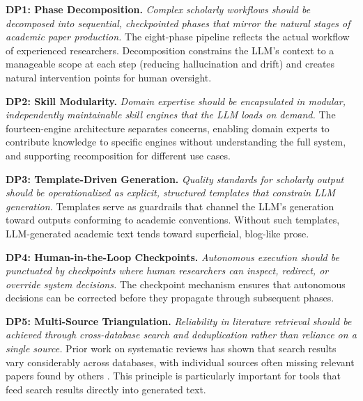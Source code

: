 \documentclass{article}
\begin{document}
\textbf{DP1: Phase Decomposition.} \emph{Complex scholarly workflows should be decomposed into sequential, checkpointed phases that mirror the natural stages of academic paper production.} The eight-phase pipeline reflects the actual workflow of experienced researchers. Decomposition constrains the LLM's context to a manageable scope at each step (reducing hallucination and drift) and creates natural intervention points for human oversight.

\textbf{DP2: Skill Modularity.} \emph{Domain expertise should be encapsulated in modular, independently maintainable skill engines that the LLM loads on demand.} The fourteen-engine architecture separates concerns, enabling domain experts to contribute knowledge to specific engines without understanding the full system, and supporting recomposition for different use cases.

\textbf{DP3: Template-Driven Generation.} \emph{Quality standards for scholarly output should be operationalized as explicit, structured templates that constrain LLM generation.} Templates serve as guardrails that channel the LLM's generation toward outputs conforming to academic conventions. Without such templates, LLM-generated academic text tends toward superficial, blog-like prose.

\textbf{DP4: Human-in-the-Loop Checkpoints.} \emph{Autonomous execution should be punctuated by checkpoints where human researchers can inspect, redirect, or override system decisions.} The checkpoint mechanism ensures that autonomous decisions can be corrected before they propagate through subsequent phases.

\textbf{DP5: Multi-Source Triangulation.} \emph{Reliability in literature retrieval should be achieved through cross-database search and deduplication rather than reliance on a single source.} Prior work on systematic reviews has shown that search results vary considerably across databases, with individual sources often missing relevant papers found by others \citep{bolanos2024ai_lit_reviews}. This principle is particularly important for tools that feed search results directly into generated text.
\end{document}
